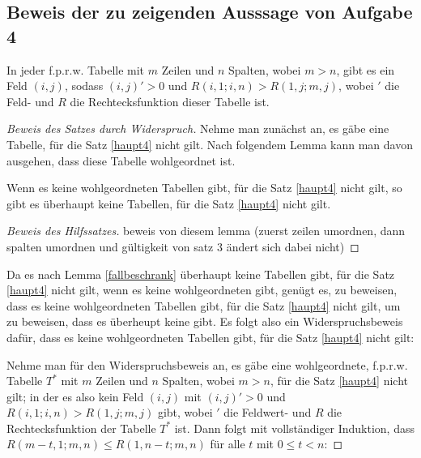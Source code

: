 \subsection*{Beweis der zu zeigenden Ausssage von Aufgabe 4}

\begin{thm}\label{haupt4}
    In jeder f.p.r.w. Tabelle mit $m$ Zeilen und $n$ Spalten, wobei $m>n$, gibt es ein Feld $(i, j)$, sodass 
    $(i, j)'>0$ und $R(i, 1; i, n) > R(1, j; m, j)$, wobei $'$ die Feld- und $R$ die Rechtecksfunktion dieser 
    Tabelle ist.
\end{thm}

\begin{proof}[Beweis des Satzes durch Widerspruch]
    Nehme man zunächst an, es gäbe eine Tabelle, für die Satz \ref{haupt4} nicht gilt. Nach folgendem Lemma kann man 
    davon ausgehen, dass diese Tabelle wohlgeordnet ist.
    \begin{lem}\label{fallbeschrank}
        Wenn es keine wohlgeordneten Tabellen gibt, für die Satz \ref{haupt4} nicht gilt, so gibt es überhaupt keine 
        Tabellen, für die Satz \ref{haupt4} nicht gilt.
    \end{lem}
    \begin{proof}[Beweis des Hilfssatzes]
        beweis von diesem lemma (zuerst zeilen umordnen, dann spalten umordnen und gültigkeit von satz 3 ändert sich 
        dabei nicht) %
    \end{proof}
    Da es nach Lemma \ref{fallbeschrank} überhaupt keine Tabellen gibt, für die Satz \ref{haupt4} 
    nicht gilt, wenn es keine wohlgeordneten gibt, genügt es, zu beweisen, dass es keine wohlgeordneten Tabellen 
    gibt, für die Satz \ref{haupt4} nicht gilt, um zu beweisen, dass es überheupt keine gibt. Es folgt also ein 
    Widerspruchsbeweis dafür, dass es keine wohlgeordneten Tabellen gibt, für die Satz \ref{haupt4} nicht gilt:

    Nehme man für den Widerspruchsbeweis an, es gäbe eine wohlgeordnete, f.p.r.w. Tabelle $T^*$ mit $m$ Zeilen und $n$ 
    Spalten, wobei $m>n$, für die Satz \ref{haupt4} nicht gilt; in der es also kein Feld $(i, j)$ mit $(i, j)'>0$ 
    und $R(i, 1; i, n)>R(1, j; m, j)$ gibt, wobei $'$ die Feldwert- und $R$ die Rechtecksfunktion der Tabelle $T^*$ 
    ist. Dann folgt mit vollständiger Induktion, dass $R(m-t, 1; m, n)\leq R(1, n-t; m, n)$ für alle $t$ mit $0\leq 
    t<n$:


\end{proof}
